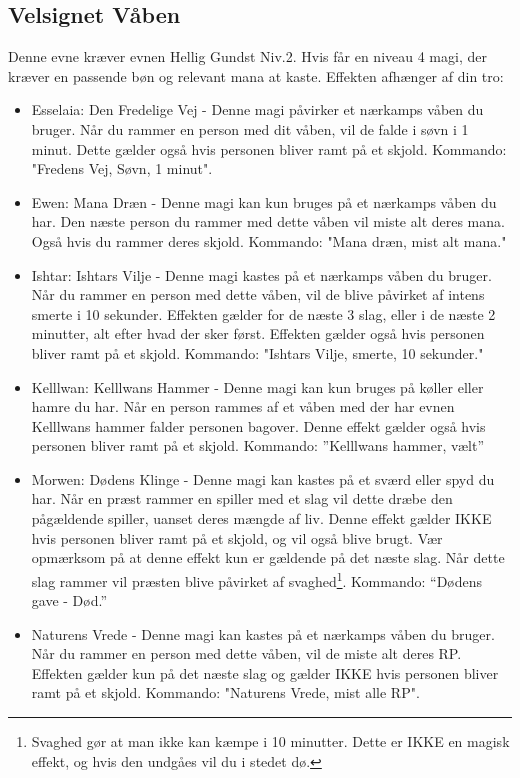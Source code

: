 \subsection{Velsignet Våben}
Denne evne kræver evnen Hellig Gundst Niv.2. 
Hvis får en niveau 4 magi, der kræver en passende bøn og relevant mana at kaste. Effekten afhænger af din tro:
\begin{itemize}
    \item Esselaia: Den Fredelige Vej - Denne magi påvirker et nærkamps våben du bruger. Når du rammer en person med dit våben, vil de falde i søvn i 1 minut. Dette gælder også hvis personen bliver ramt på et skjold. Kommando: "Fredens Vej, Søvn, 1 minut".
    \item Ewen: Mana Dræn - Denne magi kan kun bruges på et nærkamps våben du har. Den næste person du rammer med dette våben vil miste alt deres mana. Også hvis du rammer deres skjold. Kommando: "Mana dræn, mist alt mana."
    \item Ishtar: Ishtars Vilje - Denne magi kastes på et nærkamps våben du bruger. Når du rammer en person med dette våben, vil de blive påvirket af intens smerte i 10 sekunder. Effekten gælder for de næste 3 slag, eller i de næste 2 minutter, alt efter hvad der sker først. Effekten gælder også hvis personen bliver ramt på et skjold. Kommando: "Ishtars Vilje, smerte, 10 sekunder."
    \item Kelllwan: Kelllwans Hammer - Denne magi kan kun bruges på køller eller hamre du har. Når en person rammes af et våben med der har evnen Kelllwans hammer falder personen bagover. Denne effekt gælder også hvis personen bliver ramt på et skjold. Kommando: ”Kelllwans hammer, vælt”
    \item Morwen: Dødens Klinge - Denne magi kan kastes på et sværd eller spyd du har. Når en præst rammer en spiller med et slag vil dette dræbe den pågældende spiller, uanset deres mængde af liv. Denne effekt gælder IKKE hvis personen bliver ramt på et skjold, og vil også blive brugt. Vær opmærksom på at denne effekt kun er gældende på det næste slag. Når dette slag rammer vil præsten blive påvirket af svaghed\footnote{Svaghed gør at man ikke kan kæmpe i 10 minutter. Dette er IKKE en magisk effekt, og hvis den undgåes vil du i stedet dø.}. Kommando: “Dødens gave - Død.”
    \item Naturens Vrede - Denne magi kan kastes på et nærkamps våben du bruger. Når du rammer en person med dette våben, vil de miste alt deres RP. Effekten gælder kun på det næste slag og gælder IKKE hvis personen bliver ramt på et skjold. Kommando: "Naturens Vrede, mist alle RP".

\end{itemize}
